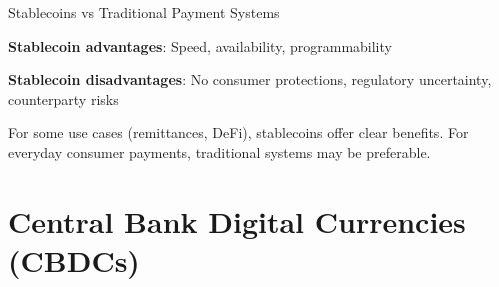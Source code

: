 \documentclass[10pt]{beamer}
\begin{document}
\begin{frame}{Stablecoins vs Traditional Payment Systems}
  
  \begin{center}
  \end{center}
  
  \vspace{1em}
  \textbf{Stablecoin advantages}: Speed, availability, programmability
  
  \textbf{Stablecoin disadvantages}: No consumer protections, regulatory uncertainty, counterparty risks
  
  \vspace{0.5em}
  For some use cases (remittances, DeFi), stablecoins offer clear benefits. For everyday consumer payments, traditional systems may be preferable.
\end{frame}

\section{Central Bank Digital Currencies (CBDCs)}
\end{document}
